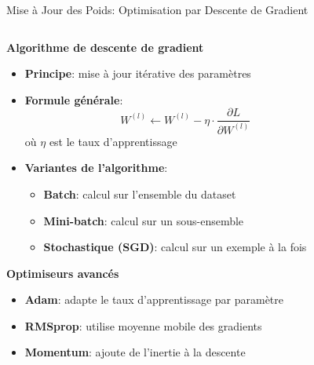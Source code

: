 \documentclass[aspectratio=169,11pt]{beamer}
\begin{document}
\begin{frame}{Mise à Jour des Poids: Optimisation par Descente de Gradient}
    \begin{columns}
        \begin{column}{0.5\textwidth}
            \textbf{Algorithme de descente de gradient}
            \begin{itemize}
                \item \textbf{Principe}: mise à jour itérative des paramètres
                \item \textbf{Formule générale}:
                \begin{equation}
                W^{(l)} \leftarrow W^{(l)} - \eta \cdot \frac{\partial L}{\partial W^{(l)}}
                \end{equation}
                où $\eta$ est le taux d'apprentissage
                
                \vspace{0.2cm}
                \item \textbf{Variantes de l'algorithme}:
                \begin{itemize}
                    \item \textbf{Batch}: calcul sur l'ensemble du dataset
                    \item \textbf{Mini-batch}: calcul sur un sous-ensemble
                    \item \textbf{Stochastique (SGD)}: calcul sur un exemple à la fois
                \end{itemize}
            \end{itemize}
            
            \vspace{0.3cm}
            \textbf{Optimiseurs avancés}
            \begin{itemize}
                \item \textbf{Adam}: adapte le taux d'apprentissage par paramètre
                \item \textbf{RMSprop}: utilise moyenne mobile des gradients
                \item \textbf{Momentum}: ajoute de l'inertie à la descente
            \end{itemize}
        \end{column}
        
        \begin{column}{0.5\textwidth}
            

\end{column}
\end{columns}
\end{frame}
\end{document}
